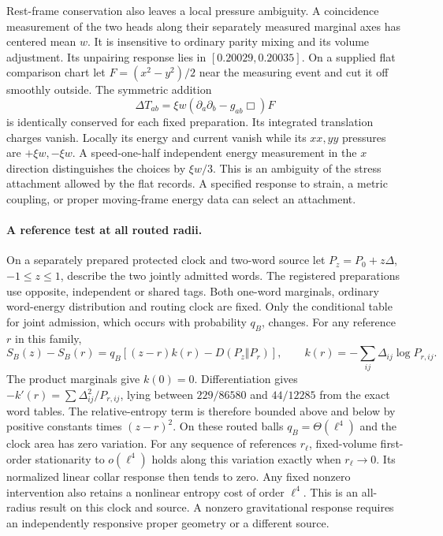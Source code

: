 \documentclass[11pt]{article}
\begin{document}
Rest-frame conservation also leaves a local pressure ambiguity.
A coincidence measurement of the two heads along their separately
measured marginal axes has centered mean \(w\). It is insensitive to
ordinary parity mixing and its volume adjustment. Its unpairing
response lies in \([0.20029,0.20035]\). On a supplied flat comparison
chart let \(F=(x^2-y^2)/2\) near the measuring event and cut it off
smoothly outside. The symmetric addition
\[
 \Delta T_{ab}=\xi w(\partial_a\partial_b-g_{ab}\Box)F
\]
is identically conserved for each fixed preparation. Its integrated
translation charges vanish. Locally its energy and current vanish
while its \(xx,yy\) pressures are \(+\xi w,-\xi w\).
A speed-one-half independent energy measurement in the \(x\)
direction distinguishes the choices by \(\xi w/3\). This is an
ambiguity of the stress attachment allowed by the flat records.
A specified response to strain, a metric coupling, or proper
moving-frame energy data can select an attachment.

\paragraph{A reference test at all routed radii.}
On a separately prepared protected clock and two-word source let
\(P_z=P_0+z\Delta\), \(-1\le z\le1\), describe the two jointly
admitted words. The registered preparations use opposite, independent
or shared tags. Both one-word marginals, ordinary word-energy
distribution and routing clock are fixed. Only the conditional table
for joint admission, which occurs with probability \(q_B\), changes.
For any reference \(r\) in this family,
\[
 S_B(z)-S_B(r)=q_B[(z-r)k(r)-D(P_z\Vert P_r)],\qquad
 k(r)=-\sum_{ij}\Delta_{ij}\log P_{r,ij}.
\]
The product marginals give \(k(0)=0\). Differentiation gives
\(-k'(r)=\sum\Delta_{ij}^2/P_{r,ij}\), lying between
\(229/86580\) and \(44/12285\) from the exact word tables.
The relative-entropy term is therefore bounded above and below by
positive constants times \((z-r)^2\). On these routed balls
\(q_B=\Theta(\ell^4)\) and the clock area has zero variation.
For any sequence of references \(r_\ell\), fixed-volume first-order
stationarity to \(o(\ell^4)\) holds along this variation exactly when
\(r_\ell\to0\). Its normalized linear collar response then tends to
zero. Any fixed nonzero intervention also retains a nonlinear
entropy cost of order \(\ell^4\). This is an all-radius result on this
clock and source. A nonzero gravitational response requires an
independently responsive proper geometry or a different source.
\end{document}
